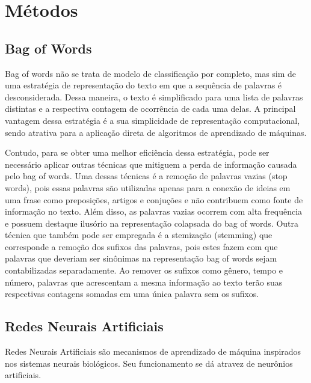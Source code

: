 \chapter{Métodos}
\noindent
\section{Bag of Words}
Bag of words não se trata de modelo de classificação por completo, mas sim de uma estratégia de representação do texto em que a sequência de palavras é desconsiderada. Dessa maneira, o texto é simplificado para uma lista de palavras distintas e a respectiva contagem de ocorrência de cada uma delas. A principal vantagem dessa estratégia é a sua simplicidade de representação computacional, sendo atrativa para a aplicação direta de algoritmos de aprendizado de máquinas.

Contudo, para se obter uma melhor eficiência dessa estratégia, pode ser necessário aplicar outras técnicas que mitiguem a perda de informação causada pelo bag of words. Uma dessas técnicas é a remoção de palavras vazias (stop words), pois essas palavras são utilizadas apenas para a conexão de ideias em uma frase como preposições, artigos e conjuções e não contribuem como fonte de informação no texto. Além disso, as palavras vazias ocorrem com alta frequência e possuem destaque ilusório na representação colapsada do bag of words. Outra técnica que também pode ser empregada é a stemização (stemming) que corresponde a remoção dos sufixos das palavras, pois estes fazem com que palavras que deveriam ser sinônimas na representação bag of words sejam contabilizadas separadamente. Ao remover os sufixos como gênero, tempo e número, palavras que acrescentam a mesma informação ao texto terão suas respectivas contagens somadas em uma única palavra sem os sufixos.

\section{Redes Neurais Artificiais}
Redes Neurais Artificiais são mecanismos de aprendizado de máquina inspirados nos sistemas neurais biológicos. Seu funcionamento se dá atravez de neurônios artificiais.

